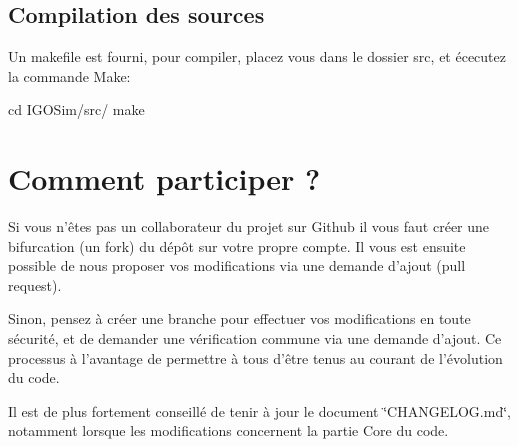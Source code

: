 \hypertarget{index_tools_compil}{}\subsection{Compilation des sources}\label{index_tools_compil}
Un makefile est fourni, pour compiler, placez vous dans le dossier src, et écecutez la commande Make\-: \begin{DoxyVerb} cd IGOSim/src/
 make
\end{DoxyVerb}
\hypertarget{index_particip}{}\section{Comment participer ?}\label{index_particip}
Si vous n'êtes pas un collaborateur du projet sur Github il vous faut créer une bifurcation (un fork) du dépôt sur votre propre compte. Il vous est ensuite possible de nous proposer vos modifications via une demande d'ajout (pull request).

Sinon, pensez à créer une branche pour effectuer vos modifications en toute sécurité, et de demander une vérification commune via une demande d'ajout. Ce processus à l'avantage de permettre à tous d'être tenus au courant de l'évolution du code.

Il est de plus fortement conseillé de tenir à jour le document \char`\"{}\-C\-H\-A\-N\-G\-E\-L\-O\-G.\-md\char`\"{}, notamment lorsque les modifications concernent la partie Core du code. 